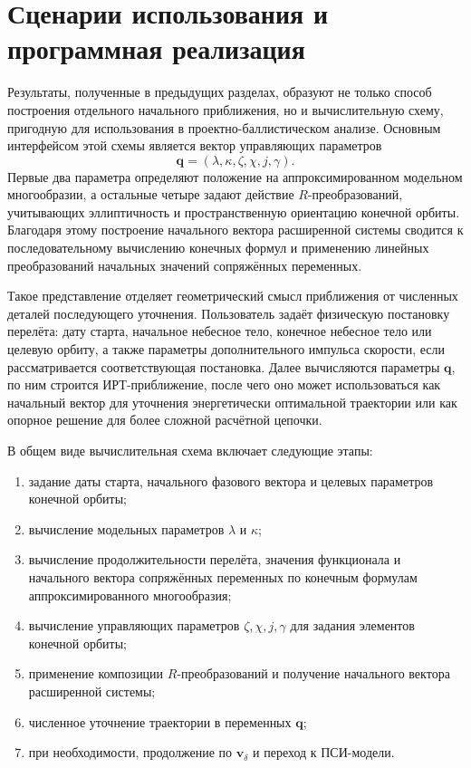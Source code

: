 \section{Сценарии использования и программная реализация}

Результаты, полученные в предыдущих разделах, образуют не только способ построения отдельного начального приближения, но и вычислительную схему, пригодную для использования в проектно-баллистическом анализе. Основным интерфейсом этой схемы является вектор управляющих параметров
\begin{equation}
\mathbf q=(\lambda,\kappa,\zeta,\chi,j,\gamma).
\end{equation}
Первые два параметра определяют положение на аппроксимированном модельном многообразии, а остальные четыре задают действие \(R\)-преобразований, учитывающих эллиптичность и пространственную ориентацию конечной орбиты. Благодаря этому построение начального вектора расширенной системы сводится к последовательному вычислению конечных формул и применению линейных преобразований начальных значений сопряжённых переменных.

Такое представление отделяет геометрический смысл приближения от численных деталей последующего уточнения. Пользователь задаёт физическую постановку перелёта: дату старта, начальное небесное тело, конечное небесное тело или целевую орбиту, а также параметры дополнительного импульса скорости, если рассматривается соответствующая постановка. Далее вычисляются параметры \(\mathbf q\), по ним строится ИРТ-приближение, после чего оно может использоваться как начальный вектор для уточнения энергетически оптимальной траектории или как опорное решение для более сложной расчётной цепочки.

В общем виде вычислительная схема включает следующие этапы:
\begin{enumerate}
	\item задание даты старта, начального фазового вектора и целевых параметров конечной орбиты;
	\item вычисление модельных параметров \(\lambda\) и \(\kappa\);
	\item вычисление продолжительности перелёта, значения функционала и начального вектора сопряжённых переменных по конечным формулам аппроксимированного многообразия;
	\item вычисление управляющих параметров \(\zeta,\chi,j,\gamma\) для задания элементов конечной орбиты;
	\item применение композиции \(R\)-преобразований и получение начального вектора расширенной системы;
	\item численное уточнение траектории в переменных \(\mathbf q\);
	\item
при необходимости, продолжение по \(\mathbf v_\delta\) и переход к ПСИ-модели.
\end{enumerate}

